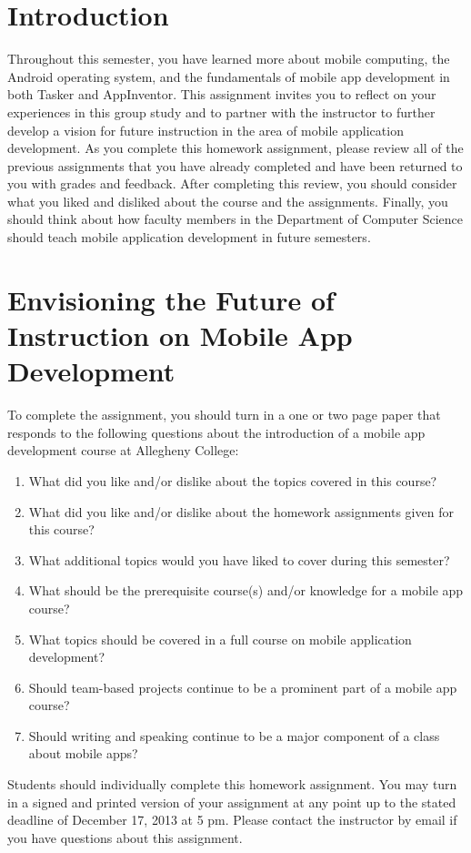 

\usepackage[compact]{titlesec}



\section*{Introduction}

Throughout this semester, you have learned more about mobile computing, the Android operating system, and the
fundamentals of mobile app development in both Tasker and AppInventor.  This assignment invites you to reflect on your
experiences in this group study and to partner with the instructor to further develop a vision for future instruction in
the area of mobile application development. As you complete this homework assignment, please review all of the previous
assignments that you have already completed and have been returned to you with grades and feedback.  After completing
this review, you should consider what you liked and disliked about the course and the assignments.  Finally, you should
think about how faculty members in the Department of Computer Science should teach mobile application development in
future semesters.

\section*{Envisioning the Future of Instruction on Mobile App Development}

\vspace*{-.05in}
\noindent
To complete the assignment, you should turn in a one or two page paper that responds to the following questions about
the introduction of a mobile app development course at Allegheny College: 
\vspace*{-.2in}
\begin{enumerate}
    \itemsep0em
    \item What did you like and/or dislike about the topics covered in this course?
    \item What did you like and/or dislike about the homework assignments given for this course?
    \item What additional topics would you have liked to cover during this semester?
    \item What should be the prerequisite course(s) and/or knowledge for a mobile app course? 
    \item What topics should be covered in a full course on mobile application development?  
    \item Should team-based projects continue to be a prominent part of a mobile app course?
    \item Should writing and speaking continue to be a major component of a class about mobile apps?
\end{enumerate} 

Students should individually complete this homework assignment.  You may turn in a signed and printed version of your
assignment at any point up to the stated deadline of December 17, 2013 at 5 pm. Please contact the instructor by email
if you have questions about this assignment.

